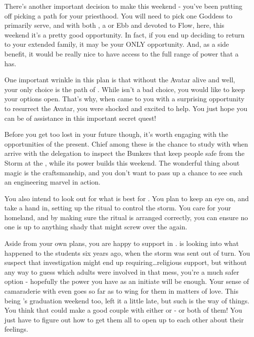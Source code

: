\documentclass[char]{GL2020}
\begin{document}
There's another important decision to make this weekend - you've been putting off picking a path for your priesthood. You will need to pick one Goddess to primarily serve, and with both \cEbbPriest{}, a \cEbbPriest{\cleric} or Ebb and \cFlowPriest{} devoted to Flow, here, this weekend it's a pretty good opportunity. In fact, if you end up deciding to return to your extended family, it may be your ONLY opportunity. And, as a side benefit, it would be really nice to have access to the full range of power that a \cInitiate{\cleric} has.

One important wrinkle in this plan is that without the \cEbb{} Avatar alive and well, your only choice is the path of \cFlow{}. While \cFlow{} isn’t a bad choice, you would like to keep your options open. That’s why, when \cFlowPriest{} came to you with a surprising opportunity to resurrect the Avatar, you were shocked and excited to help. You just hope you can be of assistance in this important secret quest!

Before you get too lost in your future though, it's worth engaging with the opportunities of the present. Chief among these is the chance to study with \cBunker{} when \cBunker{\they} arrive with the \pShip{} delegation to inspect the Bunkers that keep people safe from the Storm at the \pSc{}, while its power builds this weekend. The wonderful thing about \pShippies{} magic is the craftsmanship, and you don’t want to pass up a chance to see such an engineering marvel in action.

You also intend to look out for what is best for \pShip{}. You plan to keep an eye on, and take a hand in, setting up the ritual to control the storm. You care for your homeland, and by making sure the ritual is arranged correctly, you can ensure no one is up to anything shady that might screw over the \pShippies{} again.

Aside from your own plans, you are happy to support \cPresident{} in \cPresident{\theirs}. \cPresident{} is looking into what happened to the students six years ago, when the storm was sent out of turn. You suspect that investigation might end up requiring\ldots religious support, but without any way to guess which adults were involved in that mess, you're a much safer option - hopefully the power you have as an initiate will be enough. Your sense of camaraderie with \cPresident{} even goes so far as to wing\cInitiate{\person} for them in matters of love. This being \cPresident{}'s graduation weekend too, \cPresident{\they} \cPresident{\have} left it a little late, but such is the way of things. You think that \cPresident{} could make a good couple with either \cHeir{}or \cChupStudent{} - or both of them! You just have to figure out how to get them all to open up to each other about their feelings.
\end{document}
